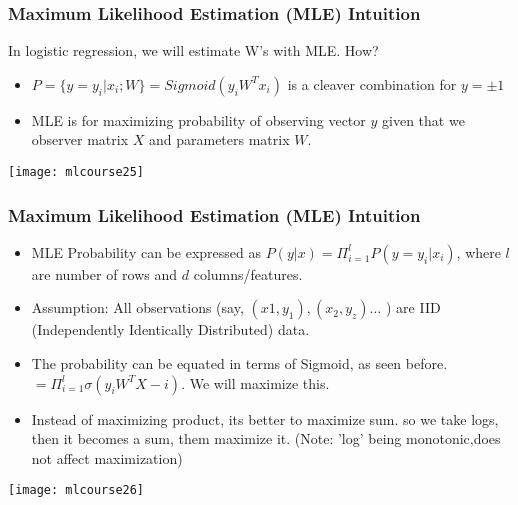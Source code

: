 \begin{frame}[fragile]\frametitle{Maximum Likelihood Estimation (MLE) Intuition}
In logistic regression, we will estimate W's with MLE. How?
\begin{itemize}
\item $P = \{y=y_i | x_i;W\} = Sigmoid(y_i W^Tx_i)$ is a cleaver combination for $y = \pm 1$

\item MLE is for maximizing probability of observing vector $y$ given that we observer matrix $X$ and parameters matrix $W$.
\end{itemize}


\begin{center}
\texttt{[image: mlcourse25]}
\end{center}

\end{frame}

\begin{frame}[fragile]\frametitle{Maximum Likelihood Estimation (MLE) Intuition}
\begin{itemize}
\item MLE Probability can be expressed as $P(y|x) = \Pi_{i=1}^l P(y = y_i | x_i)$, where $l$ are number of rows and $d$ columns/features.
\item Assumption: All observations (say, $(x1,y_1),(x_2,y_z) \ldots $ ) are IID (Independently Identically Distributed) data.
\item The probability can be equated in terms of Sigmoid, as seen before.
$= \Pi_{i=1}^l \sigma(y_i W^TX-i)$. We will maximize this. 
\item Instead of maximizing product, its better to maximize sum. so we take logs, then it becomes a sum, them maximize it. (Note: 'log' being monotonic,does not affect maximization)
\end{itemize}


\begin{center}
\texttt{[image: mlcourse26]}
\end{center}

\end{frame}


